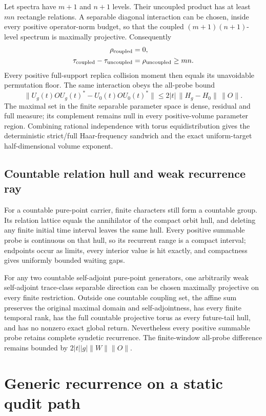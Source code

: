 Let spectra have $m+1$ and $n+1$ levels.  Their uncoupled product has at
least $mn$ rectangle relations.  A separable diagonal interaction can be
chosen, inside every positive operator-norm budget, so that the coupled
$(m+1)(n+1)$-level spectrum is maximally projective.  Consequently
\begin{align*}
 \rho_{\rm coupled}&=0,\\
 \tau_{\rm coupled}-\tau_{\rm uncoupled}&=\rho_{\rm uncoupled}\ge mn.
\end{align*}
Every positive full-support replica collision moment then equals its
unavoidable permutation floor.  The same interaction obeys the all-probe
bound
\[
 \|U_g(t)OU_g(t)^*-U_0(t)OU_0(t)^*\|
 \le2|t|\,\|H_g-H_0\|\,\|O\|.
\]
The maximal set in the finite separable parameter space is dense, residual
and full measure; its complement remains null in every positive-volume
parameter region.  Combining rational independence with torus
equidistribution gives the deterministic strict/full Haar-frequency
sandwich and the exact uniform-target half-dimensional volume exponent.

\subsection{Countable relation hull and weak recurrence ray}

For a countable pure-point carrier, finite characters still form a countable
group.  Its relation lattice equals the annihilator of the compact orbit
hull, and deleting any finite initial time interval leaves the same hull.
Every positive summable probe is continuous on that hull, so its recurrent
range is a compact interval; endpoints occur as limits, every interior value
is hit exactly, and compactness gives uniformly bounded waiting gaps.

For any two countable self-adjoint pure-point generators, one arbitrarily weak
self-adjoint trace-class separable direction can be chosen maximally
projective on every finite restriction.  Outside one countable coupling set,
the affine sum preserves the original maximal domain and self-adjointness,
has every finite temporal rank, has the full countable projective torus as
every future-tail hull, and has no nonzero exact global return.  Nevertheless
every positive summable probe retains complete syndetic recurrence.  The
finite-window all-probe difference remains bounded by
$2|t||g|\|W\|\|O\|$.

\section{Generic recurrence on a static qudit path}

